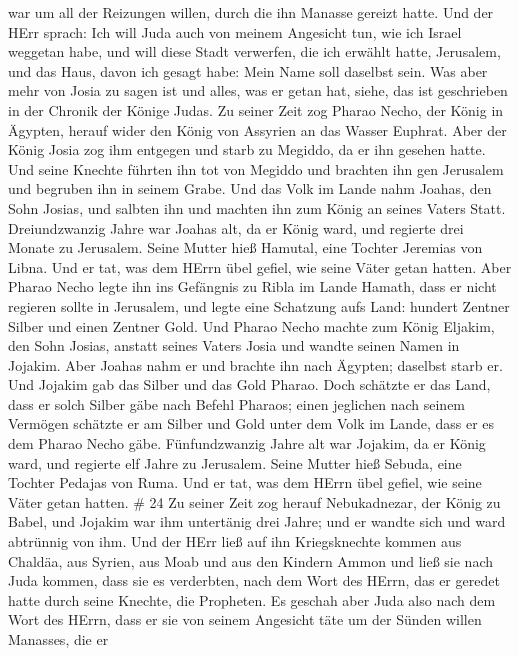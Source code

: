 war um all der Reizungen willen, durch die ihn Manasse gereizt hatte.
 Und der HErr sprach: Ich will Juda auch von meinem
Angesicht tun, wie ich Israel weggetan habe, und will diese Stadt
verwerfen, die ich erwählt hatte, Jerusalem, und das Haus, davon ich
gesagt habe: Mein Name soll daselbst sein.  Was aber mehr
von Josia zu sagen ist und alles, was er getan hat, siehe, das ist
geschrieben in der Chronik der Könige Judas.  Zu seiner
Zeit zog Pharao Necho, der König in Ägypten, herauf wider den König von
Assyrien an das Wasser Euphrat. Aber der König Josia zog ihm entgegen
und starb zu Megiddo, da er ihn gesehen hatte.  Und seine
Knechte führten ihn tot von Megiddo und brachten ihn gen Jerusalem und
begruben ihn in seinem Grabe. Und das Volk im Lande nahm Joahas, den
Sohn Josias, und salbten ihn und machten ihn zum König an seines Vaters
Statt.  Dreiundzwanzig Jahre war Joahas alt, da er König
ward, und regierte drei Monate zu Jerusalem. Seine Mutter hieß Hamutal,
eine Tochter Jeremias von Libna.  Und er tat, was dem HErrn
übel gefiel, wie seine Väter getan hatten.  Aber Pharao
Necho legte ihn ins Gefängnis zu Ribla im Lande Hamath, dass er nicht
regieren sollte in Jerusalem, und legte eine Schatzung aufs Land:
hundert Zentner Silber und einen Zentner Gold.  Und Pharao
Necho machte zum König Eljakim, den Sohn Josias, anstatt seines Vaters
Josia und wandte seinen Namen in Jojakim. Aber Joahas nahm er und
brachte ihn nach Ägypten; daselbst starb er.  Und Jojakim
gab das Silber und das Gold Pharao. Doch schätzte er das Land, dass er
solch Silber gäbe nach Befehl Pharaos; einen jeglichen nach seinem
Vermögen schätzte er am Silber und Gold unter dem Volk im Lande, dass er
es dem Pharao Necho gäbe.  Fünfundzwanzig Jahre alt war
Jojakim, da er König ward, und regierte elf Jahre zu Jerusalem. Seine
Mutter hieß Sebuda, eine Tochter Pedajas von Ruma.  Und er
tat, was dem HErrn übel gefiel, wie seine Väter getan hatten. \# 24
 Zu seiner Zeit zog herauf Nebukadnezar, der König zu Babel,
und Jojakim war ihm untertänig drei Jahre; und er wandte sich und ward
abtrünnig von ihm.  Und der HErr ließ auf ihn Kriegsknechte
kommen aus Chaldäa, aus Syrien, aus Moab und aus den Kindern Ammon und
ließ sie nach Juda kommen, dass sie es verderbten, nach dem Wort des
HErrn, das er geredet hatte durch seine Knechte, die Propheten.
 Es geschah aber Juda also nach dem Wort des HErrn, dass er
sie von seinem Angesicht täte um der Sünden willen Manasses, die er
